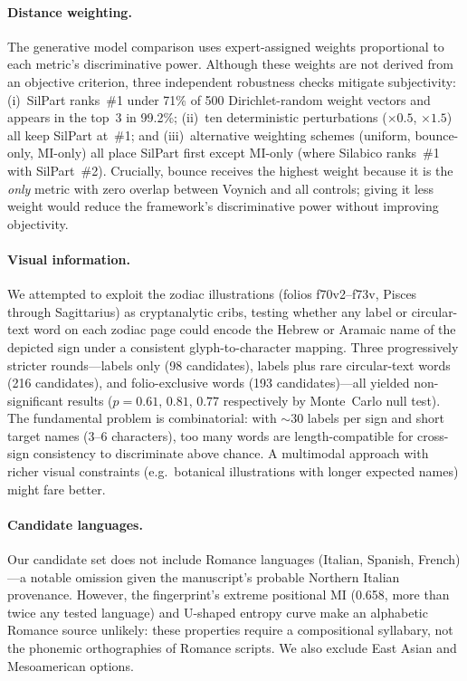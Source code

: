 \paragraph{Distance weighting.}
The generative model comparison uses expert-assigned weights proportional to each metric's discriminative power.  Although these weights are not derived from an objective criterion, three independent robustness checks mitigate subjectivity: (i)~SilPart ranks~\#1 under 71\% of 500 Dirichlet-random weight vectors and appears in the top~3 in 99.2\%; (ii)~ten deterministic perturbations ($\times 0.5$, $\times 1.5$) all keep SilPart at~\#1; and (iii)~alternative weighting schemes (uniform, bounce-only, MI-only) all place SilPart first except MI-only (where Silabico ranks~\#1 with SilPart~\#2).  Crucially, bounce receives the highest weight because it is the \emph{only} metric with zero overlap between Voynich and all controls; giving it less weight would reduce the framework's discriminative power without improving objectivity.

\paragraph{Visual information.}
We attempted to exploit the zodiac illustrations (folios f70v2--f73v, Pisces through Sagittarius) as cryptanalytic cribs, testing whether any label or circular-text word on each zodiac page could encode the Hebrew or Aramaic name of the depicted sign under a consistent glyph-to-character mapping.  Three progressively stricter rounds---labels only (98 candidates), labels plus rare circular-text words (216 candidates), and folio-exclusive words (193 candidates)---all yielded non-significant results ($p = 0.61$, $0.81$, $0.77$ respectively by Monte~Carlo null test).  The fundamental problem is combinatorial: with $\sim$30 labels per sign and short target names (3--6 characters), too many words are length-compatible for cross-sign consistency to discriminate above chance.  A multimodal approach with richer visual constraints (e.g.\ botanical illustrations with longer expected names) might fare better.

\paragraph{Candidate languages.}
Our candidate set does not include Romance languages (Italian, Spanish, French)---a notable omission given the manuscript's probable Northern Italian provenance.  However, the fingerprint's extreme positional MI (0.658, more than twice any tested language) and U-shaped entropy curve make an alphabetic Romance source unlikely: these properties require a compositional syllabary, not the phonemic orthographies of Romance scripts.  We also exclude East Asian and Mesoamerican options.

